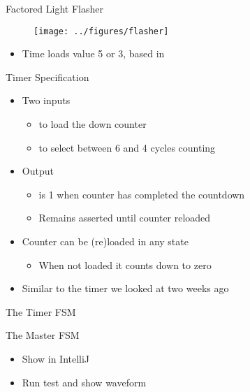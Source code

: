 \begin{frame}[fragile]{Factored Light Flasher}
\begin{figure}
  \texttt{[image: ../figures/flasher]}
\end{figure}
\begin{itemize}
\item Time loads value 5 or 3, based in 
\end{itemize}
\end{frame}

\begin{frame}[fragile]{Timer Specification}
\begin{itemize}
\item Two inputs
\begin{itemize}
\item {} to load the down counter
\item {} to select between 6 and 4 cycles counting
\end{itemize}
\item Output
\begin{itemize}
\item {} is 1 when counter has completed the countdown
\item Remains asserted until counter reloaded
\end{itemize}
\item Counter can be (re)loaded in any state
\begin{itemize}
\item When not loaded it counts down to zero
\end{itemize}
\item Similar to the timer we looked at two weeks ago
\end{itemize}
\end{frame}

\begin{frame}[fragile]{The Timer FSM}
\end{frame}

\begin{frame}[fragile]{The Master FSM}
\begin{itemize}
\item Show in IntelliJ
\item Run test and show waveform
\end{itemize}
\end{frame}


%

